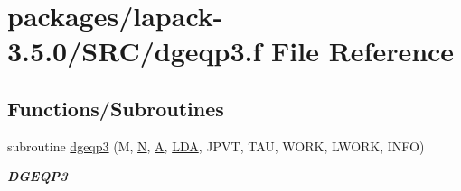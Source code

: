 \hypertarget{dgeqp3_8f}{}\section{packages/lapack-\/3.5.0/\+S\+R\+C/dgeqp3.f File Reference}
\label{dgeqp3_8f}
\subsection*{Functions/\+Subroutines}
\begin{DoxyCompactItemize}
\item 
subroutine \hyperlink{group__doubleGEcomputational_ga1b0500f49e03d2771b797c6e88adabbb}{dgeqp3} (M, \hyperlink{polmisc_8c_a0240ac851181b84ac374872dc5434ee4}{N}, \hyperlink{classA}{A}, \hyperlink{example__user_8c_ae946da542ce0db94dced19b2ecefd1aa}{L\+D\+A}, J\+P\+V\+T, T\+A\+U, W\+O\+R\+K, L\+W\+O\+R\+K, I\+N\+F\+O)
\begin{DoxyCompactList}\small\item\em {\bfseries D\+G\+E\+Q\+P3} \end{DoxyCompactList}\end{DoxyCompactItemize}
